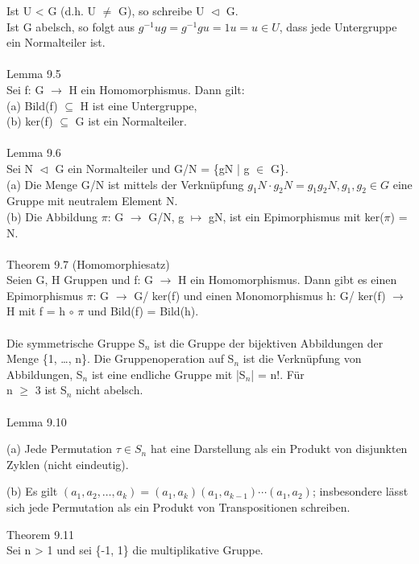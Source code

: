Ist U < G (d.h. U $\neq$ G), so schreibe U $\vartriangleleft$ G.\\
Ist G abelsch, so folgt aus $g^{-1}ug = g^{-1}gu = 1u = u \in U$, dass jede Untergruppe ein Normalteiler ist.\\
\\
Lemma 9.5\\
Sei f: G $\to$ H ein Homomorphismus. Dann gilt:\\
(a) Bild(f) $\subseteq$ H ist eine Untergruppe,\\
(b) ker(f) $\subseteq$ G ist ein Normalteiler.\\
\\
Lemma 9.6\\
Sei N $\vartriangleleft$ G ein Normalteiler und G/N = \{gN | g $\in$ G\}.\\
(a) Die Menge G/N ist mittels der Verknüpfung $g_1N \cdot g_2N = g_1g_2N, g_1,g_2 \in G$ eine Gruppe mit neutralem \hspace*{5mm} Element N.\\
(b) Die Abbildung $\pi$: G $\to$ G/N, g $\mapsto$ gN, ist ein Epimorphismus mit ker($\pi$) = N.\\
\\
Theorem 9.7 (Homomorphiesatz)\\
Seien G, H Gruppen und f: G $\to$ H ein Homomorphismus. Dann gibt es einen Epimorphismus $\pi$: G $\to$ G/ ker(f) und einen Monomorphismus h: G/ ker(f) $\to$ H mit f = h $\circ$ $\pi$ und Bild(f) = Bild(h).\\
\\
Die symmetrische Gruppe S$_n$ ist die Gruppe der bijektiven Abbildungen der Menge \{1, …, n\}. Die Gruppenoperation auf S$_n$ ist die Verknüpfung von Abbildungen, S$_n$ ist eine endliche Gruppe mit |S$_n$| = n!. Für \\n $\ge$ 3 ist S$_n$ nicht abelsch.\\
\\
Lemma 9.10
\begin{compactenum}
\item[(a)] Jede Permutation $\tau \in S_n$ hat eine Darstellung als ein Produkt von disjunkten Zyklen (nicht eindeutig).
\item[(b)] Es gilt $(a_1, a_2, …, a_k) = (a_1, a_k)(a_1, a_{k-1}) \cdots (a_1, a_2)$; insbesondere lässt sich jede Permutation als ein Produkt von Transpositionen schreiben.\\
\end{compactenum}
Theorem 9.11\\
Sei n > 1 und sei \{-1, 1\} die multiplikative Gruppe.
